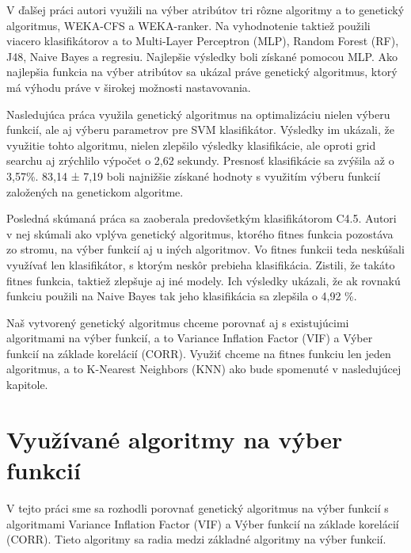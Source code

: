 \documentclass[runningheads]{llncs}
\begin{document}
V ďalšej práci\cite{ref_babatunde} autori využili na výber atribútov tri rôzne algoritmy a to 
genetický algoritmus, WEKA-CFS a WEKA-ranker. Na vyhodnotenie taktiež použili viacero klasifikátorov
a to Multi-Layer Perceptron (MLP), Random Forest (RF), J48, Naive Bayes a regresiu. Najlepšie výsledky 
boli získané pomocou MLP. Ako najlepšia funkcia na výber atribútov sa ukázal práve genetický algoritmus,
ktorý má výhodu práve v širokej možnosti nastavovania.

Nasledujúca práca\cite{ref_zhao} využila genetický algoritmus na optimalizáciu nielen výberu funkcií, 
ale aj výberu parametrov pre SVM klasifikátor. Výsledky im ukázali, 
že využitie tohto algoritmu, nielen zlepšilo výsledky klasifikácie, 
ale oproti  grid searchu aj zrýchlilo výpočet o 2,62 sekundy.
Presnosť klasifikácie sa zvýšila až o 3,57\%. 83,14 ± 7,19 boli najnižšie 
získané hodnoty s využitím výberu funkcií založených na genetickom algoritme.

Posledná skúmaná práca \cite{ref_smith} sa zaoberala predovšetkým klasifikátorom C4.5.
Autori v nej skúmali ako vplýva genetický algoritmus, ktorého fitnes funkcia pozostáva zo stromu, 
na výber funkcií aj u iných algoritmov. Vo fitnes funkcii teda neskúšali využívať len
klasifikátor, s ktorým neskôr prebieha klasifikácia. Zistili, že takáto fitnes funkcia,
taktiež zlepšuje aj iné modely. Ich výsledky ukázali, že ak rovnakú funkciu použili na 
Naive Bayes tak jeho klasifikácia sa zlepšila o 4,92 \%.

Naš vytvorený genetický algoritmus chceme porovnať aj s existujúcimi algoritmami na výber 
funkcií, a to Variance Inflation Factor (VIF) a Výber funkcií na základe korelácií (CORR). Využiť chceme
na fitnes funkciu len jeden algoritmus, a to K-Nearest Neighbors (KNN) ako bude spomenuté v nasledujúcej kapitole.


\section{Využívané algoritmy na výber funkcií}
V tejto práci sme sa rozhodli porovnať genetický algoritmus na výber funkcií s
algoritmami Variance Inflation Factor (VIF) a Výber funkcií na základe korelácií (CORR). Tieto 
algoritmy sa radia medzi základné algoritmy na výber funkcií. \cite{ref_xu}
\end{document}
